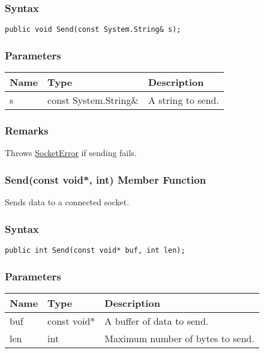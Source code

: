 \documentclass[a4paper,oneside,11.000000pt]{book}
\begin{document}
\subsubsection*{Syntax}\texttt{public void Send(const System.String\& s);}

\subsubsection*{Parameters}
\begin{flushleft}
\begin{supertabular}[l]{lll}
\textbf{Name}
& \textbf{Type}
& \textbf{Description}
\\
\hline
s
& const System.\-String\&\-
& A string to send.

\\
\end{supertabular}

\end{flushleft}
\subsubsection*{Remarks}
\begin{flushleft}
Throws \hyperlink{System.Net.Sockets.SocketError}{SocketError} if sending fails.

\end{flushleft}
\clearpage

\hypertarget{System.Net.Sockets.TcpSocket.Send.P.System.Net.Sockets.TcpSocket.C.P.void.int}{\subsubsection*{Send(const void*, int) Member Function}}\begin{flushleft}
Sends data to a connected socket.

\end{flushleft}

\subsubsection*{Syntax}\texttt{public int Send(const void* buf, int len);}
\subsubsection*{Parameters}
\begin{flushleft}
\begin{supertabular}[l]{lll}
\textbf{Name}
& \textbf{Type}
& \textbf{Description}
\\
\hline
buf
& const void*
& A buffer of data to send.

\\
len
& int
& Maximum number of bytes to send.

\\
\end{supertabular}

\end{flushleft}
\end{document}
